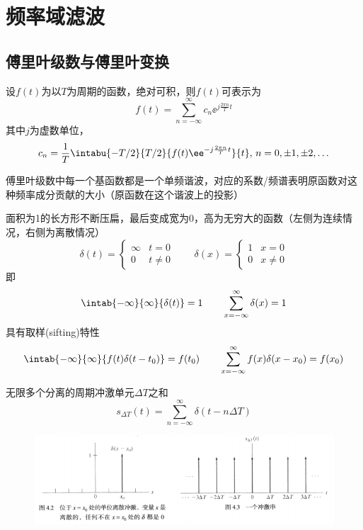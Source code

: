 
\section{频率域滤波} %
\subsection{傅里叶级数与傅里叶变换}
\begin{definition}[傅里叶级数]
设$f(t)$为以$T$为周期的函数，绝对可积，则$f(t)$可表示为
\[f(t)=\sum_{n=-\infty}^{\infty}c_n\ee^{j\frac{2\pi n}{T}t}\]
其中$j$为虚数单位，
\[c_n=\frac{1}{T}\intabu{-T/2}{T/2}{f(t)\ee^{-j\frac{2\pi n}{T}t}}{t},\,n=0,\pm 1,\pm 2,\ldots\]
\end{definition}

傅里叶级数中每一个基函数都是一个单频谐波，对应的系数/频谱表明原函数对这种频率成分贡献的大小（原函数在这个谐波上的投影）

\begin{definition}
面积为1的长方形不断压扁，最后变成宽为0，高为无穷大的函数（左侧为连续情况，右侧为离散情况）
\[\delta(t)=\begin{cases}
\infty & t=0\\
0 & t\ne 0
\end{cases}\qquad
\delta(x)=\begin{cases}
1 & x=0\\
0 & x\ne 0
\end{cases}\]
即
\[\intab{-\infty}{\infty}{\delta(t)}=1
\qquad
\sum_{x=-\infty}^{\infty}\delta(x)=1\]
具有取样(sifting)特性
\[\intab{-\infty}{\infty}{f(t)\delta(t-t_0)}=f(t_0)
\qquad
\sum_{x=-\infty}^{\infty}f(x)\delta(x-x_0)=f(x_0)\]
\end{definition}
\begin{definition}[冲激串]
无限多个分离的周期冲激单元$\Delta T$之和
\[s_{\Delta T}(t)=\sum_{n=-\infty}^{\infty}\delta(t-n\Delta T)\]
\end{definition}
\begin{figure}[H]
\centering
\includegraphics[width=0.8\linewidth]{fig/impulse.png}
\end{figure}

